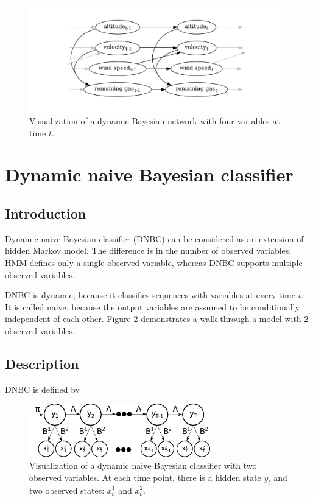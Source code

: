 \documentclass[thesis=B,english]{FITthesis}[2012/06/26]
\begin{document}
\begin{figure}
	\centering
 	\includegraphics[width=1\textwidth]{dbn}
 	\caption{Visualization of a dynamic Bayesian network with four variables at time $t$.}
 	\label{fig:dbn}
\end{figure}

\section{Dynamic naive Bayesian classifier}

\subsection{Introduction}

Dynamic naive Bayesian classifier (DNBC) can be considered as an extension of hidden Markov model. The difference is in the number of observed variables. HMM defines only a single observed variable, whereas DNBC supports multiple observed variables.

DNBC is dynamic, because it classifies sequences with variables at every time $t$. It is called naive, because the output variables are assumed to be conditionally independent of each other. Figure \ref{fig:dnbc} demonstrates a walk through a model with 2 observed variables. 

\subsection{Description}

DNBC is defined by

\begin{figure}
	\centering
 	\includegraphics[width=0.7\textwidth]{dnbc}
 	\caption{Visualization of a dynamic naive Bayesian classifier with two observed variables. At each time point, there is a hidden state $y_t$ and two observed states: $x_t^1$ and $x_t^2$.}
 	\label{fig:dnbc}
\end{figure}
\end{document}
